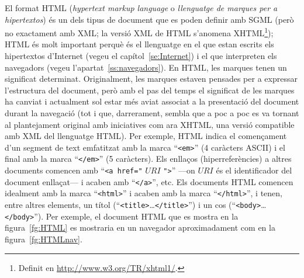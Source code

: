 El format HTML (\emph{hypertext markup language} o \emph{llenguatge de
  marques per a hipertextos}) és un dels tipus de document que es
poden definir amb SGML (però no exactament amb XML; la versió XML de
HTML s'anomena XHTML\footnote{Definit en \url{http://www.w3.org/TR/xhtml1/}.}); HTML és molt important perquè és el llenguatge
en el que estan escrits els hipertextos d'Internet (vegeu el
capítol~\ref{se:Internet}) i el que interpreten els navegadors (vegeu
l'apartat~\ref{ss:navegadors}). En HTML, les marques tenen un
significat determinat. Originalment, les marques estaven pensades per
a expressar l'estructura del document, però amb el pas del temps el
significat de les marques ha canviat i actualment sol estar més aviat
associat a la presentació del document durant la navegació (tot i que,
darrerament, sembla que a poc a poc es va tornant al plantejament
original amb iniciatives com ara XHTML, una versió compatible amb XML
del llenguatge HTML). Per exemple, HTML indica el començament d'un
segment de text emfatitzat amb la marca ``{\tt <em>}'' (4
caràcters ASCII) i el final amb la marca ``{\tt </em>}'' (5
caràcters). Els enllaços (hiperreferències) a altres documents
comencen amb ``\texttt{<a href="} $URI$ \texttt{"}\texttt{>}'' ---on
$URI$ és el identificador del document enllaçat--- i acaben amb
``\texttt{</a>}'', etc. Els documents HTML comencen idealment amb la
marca ``\texttt{<html>}'' i acaben amb la marca ``\texttt{</html>}'',
i tenen, entre altres elements, un títol
(``\texttt{<title>}\ldots\texttt{</title>}'') i un cos
(``\texttt{<body>}\ldots\texttt{</body>}''). Per exemple, el document
HTML que es mostra en la figura~\ref{fg:HTML} es mostraria en un
navegador aproximadament com en la figura~\ref{fg:HTMLnav}.

